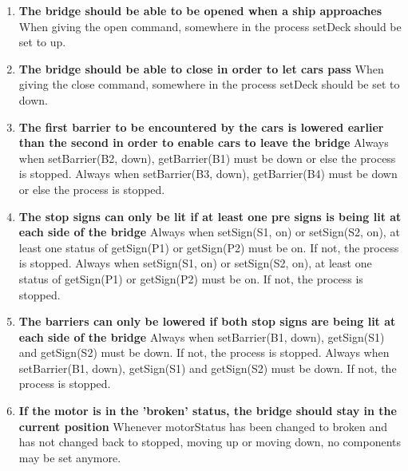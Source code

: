 \begin{enumerate}
	\item \textbf{The bridge should be able to be opened when a ship approaches}
	When giving the open command, somewhere in the process setDeck should be set to up.

	\item \textbf{The bridge should be able to close in order to let cars pass}
	When giving the close command, somewhere in the process setDeck should be set to down.

	\item \textbf{The first barrier to be encountered by the cars is lowered earlier than the second in order to enable cars to leave the bridge}
	Always when setBarrier(B2, down), getBarrier(B1) must be down or else the process is stopped. 
	Always when setBarrier(B3, down), getBarrier(B4) must be down or else the process is stopped. 

	\item \textbf{The stop signs can only be lit if at least one pre signs is being lit at each side of the bridge}
	Always when setSign(S1, on) or setSign(S2, on), at least one status of getSign(P1) or getSign(P2) must be on. If not, the process is stopped.
	Always when setSign(S1, on) or setSign(S2, on), at least one status of getSign(P1) or getSign(P2) must be on. If not, the process is stopped.

	\item \textbf{The barriers can only be lowered if both stop signs are being lit at each side of the bridge}
	Always when setBarrier(B1, down), getSign(S1) and getSign(S2) must be down. If not, the process is stopped.
	Always when setBarrier(B1, down), getSign(S1) and getSign(S2) must be down. If not, the process is stopped.

	\item \textbf{If the motor is in the 'broken' status, the bridge should stay in the current position}
	Whenever motorStatus has been changed to broken and has not changed back to stopped, moving up or moving down, no components may be set anymore.

\end{enumerate}
